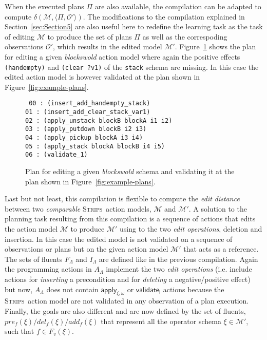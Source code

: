 \documentclass[3p,times]{elsarticle}
\newcommand{\strips}{\textsc{Strips}}     %
\newcommand{\tup}[1]{{\langle #1 \rangle}}
\begin{document}
When the executed plans $\Pi$ are also available, the compilation can be adapted to compute $\delta(\mathcal{M},\tup{\Pi,\mathcal{O'}})$. The modifications to the compilation explained in Section~\ref{sec:Section5} are also useful here to redefine the learning task as the task of editing $\mathcal{M}$ to produce the set of plans $\Pi$ as well as the correspoding observations $\mathcal{O'}$, which results in the edited model $\mathcal{M}'$. Figure~\ref{fig:plan-pdistance} shows the plan for editing a given {\em blockswold} action model where again the positive effects {\tt\small (handempty)} and {\tt\small (clear ?v1)} of the {\tt\small stack} schema are missing. In this case the edited action model is however validated at the plan shown in Figure~\ref{fig:example-plans}.

\begin{figure}[hbt!]
{\tt\small
00 : (insert\_add\_handempty\_stack)\\
01 : (insert\_add\_clear\_stack\_var1)\\
02 : (apply\_unstack blockB blockA i1 i2)\\
03 : (apply\_putdown blockB i2 i3)\\
04 : (apply\_pickup blockA i3 i4)\\
05 : (apply\_stack blockA blockB i4 i5)\\
06 : (validate\_1)
}
 \caption{\small Plan for editing a given {\em blockswold} schema and validating it at the plan shown in Figure~\ref{fig:example-plans}.}
\label{fig:plan-pdistance}
\end{figure}

Last but not least, this compilation is flexible to compute the {\em edit distance} between two {\em comparable} \strips\ action models, $\mathcal{M}$ and $\mathcal{M}'$. A solution to the planning task resulting from this compilation is a sequence of actions that edits the action model $\mathcal{M}$ to produce $\mathcal{M}'$ using to the two {\em edit operations}, deletion and insertion. In this case the edited model is not validated on a sequence of observations or plans but on the given action model $\mathcal{M}'$ that acts as a reference. The sets of fluents $F_{\Lambda}$ and $I_{\Lambda}$ are defined like in the previous compilation. Again the programming actions in $A_{\Lambda}$ implement the two {\em edit operations} (i.e. include actions for {\em inserting} a precondition and for {\em deleting} a negative/positive effect) but now, $A_{\Lambda}$ does not contain $\mathsf{apply_{\xi,\omega}}$ or $\mathsf{validate_{i}}$ actions because the \strips\ action model are not validated in any observation of a plan execution. Finally, the goals are also different and are now defined by the set of fluents, $pre_f(\xi)/del_f(\xi)/add_f(\xi)$ that represent all the operator schema $\xi\in\mathcal{M'}$, such that $f\in F_v(\xi)$.
\end{document}
